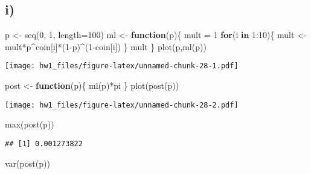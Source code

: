 \documentclass[
]{article}
\newenvironment{Shaded}{\begin{snugshade}}{\end{snugshade}}
\newcommand{\AttributeTok}[1]{\textcolor[rgb]{0.77,0.63,0.00}{#1}}
\newcommand{\ControlFlowTok}[1]{\textcolor[rgb]{0.13,0.29,0.53}{\textbf{#1}}}
\newcommand{\DecValTok}[1]{\textcolor[rgb]{0.00,0.00,0.81}{#1}}
\newcommand{\FunctionTok}[1]{\textcolor[rgb]{0.00,0.00,0.00}{#1}}
\newcommand{\NormalTok}[1]{#1}
\newcommand{\OtherTok}[1]{\textcolor[rgb]{0.56,0.35,0.01}{#1}}
\newcommand{\SpecialCharTok}[1]{\textcolor[rgb]{0.00,0.00,0.00}{#1}}
\begin{document}
\hypertarget{i-2}{%
\subsection{i)}\label{i-2}}

\begin{Shaded}
\begin{Highlighting}[]
\NormalTok{p }\OtherTok{\textless{}{-}} \FunctionTok{seq}\NormalTok{(}\DecValTok{0}\NormalTok{, }\DecValTok{1}\NormalTok{, }\AttributeTok{length=}\DecValTok{100}\NormalTok{)}
\NormalTok{ml }\OtherTok{\textless{}{-}} \ControlFlowTok{function}\NormalTok{(p)\{}
\NormalTok{  mult }\OtherTok{=} \DecValTok{1} 
  \ControlFlowTok{for}\NormalTok{(i }\ControlFlowTok{in} \DecValTok{1}\SpecialCharTok{:}\DecValTok{10}\NormalTok{)\{}
\NormalTok{    mult }\OtherTok{\textless{}{-}}\NormalTok{ mult}\SpecialCharTok{*}\NormalTok{p}\SpecialCharTok{\^{}}\NormalTok{coin[i]}\SpecialCharTok{*}\NormalTok{(}\DecValTok{1}\SpecialCharTok{{-}}\NormalTok{p)}\SpecialCharTok{\^{}}\NormalTok{(}\DecValTok{1}\SpecialCharTok{{-}}\NormalTok{coin[i])}
\NormalTok{  \}}
\NormalTok{  mult}
\NormalTok{\}}
\FunctionTok{plot}\NormalTok{(p,}\FunctionTok{ml}\NormalTok{(p))}
\end{Highlighting}
\end{Shaded}

\texttt{[image: hw1\_files/figure-latex/unnamed-chunk-28-1.pdf]}

\begin{Shaded}
\begin{Highlighting}[]
\NormalTok{post }\OtherTok{\textless{}{-}} \ControlFlowTok{function}\NormalTok{(p)\{}
  \FunctionTok{ml}\NormalTok{(p)}\SpecialCharTok{*}\NormalTok{pi}
\NormalTok{\}}
\FunctionTok{plot}\NormalTok{(}\FunctionTok{post}\NormalTok{(p))}
\end{Highlighting}
\end{Shaded}

\texttt{[image: hw1\_files/figure-latex/unnamed-chunk-28-2.pdf]}

\begin{Shaded}
\begin{Highlighting}[]
\FunctionTok{max}\NormalTok{(}\FunctionTok{post}\NormalTok{(p))}
\end{Highlighting}
\end{Shaded}

\begin{verbatim}
## [1] 0.001273822
\end{verbatim}

\begin{Shaded}
\begin{Highlighting}[]
\FunctionTok{var}\NormalTok{(}\FunctionTok{post}\NormalTok{(p))}
\end{Highlighting}
\end{Shaded}
\end{document}
